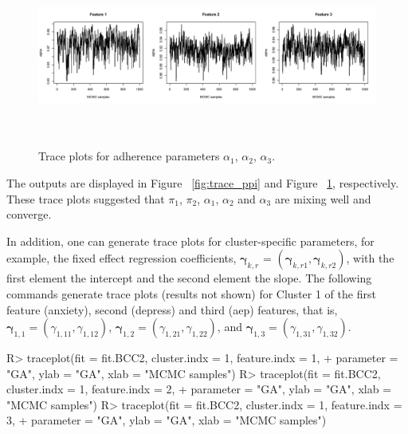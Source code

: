 \begin{figure}[h]
\centering
\includegraphics[width=\textwidth,height=6cm]{./Figures/trace_alpha.JPEG}
\caption{\label{fig:trace_alpha}  Trace plots for adherence parameters $\alpha_1$, $\alpha_2$, $\alpha_3$.}
\end{figure}

The outputs are displayed in Figure ~\ref{fig:trace_ppi} and Figure ~\ref{fig:trace_alpha}, respectively. These trace plots suggested that $\pi_1$, $\pi_2$, $\alpha_1$, $\alpha_2$ and $\alpha_3$ are mixing well and converge. 

In addition, one can generate trace plots for cluster-specific parameters, for example, the fixed effect regression coefficients, $\boldsymbol{\gamma}_{k, r}$ = $(\boldsymbol{\gamma}_{k, r1}, \boldsymbol{\gamma}_{k, r2})$, with the first element the intercept and the second element the slope.  The following commands generate trace plots (results not shown) for Cluster 1 of the first feature (anxiety), second (depress) and third (aep) features, that is,  $\boldsymbol{\gamma}_{1,1} = (\gamma_{1,11}, \gamma_{1,12})$,  $\boldsymbol{\gamma}_{1,2} = (\gamma_{1,21}, \gamma_{1,22})$, and $\boldsymbol{\gamma}_{1,3} = (\gamma_{1,31}, \gamma_{1,32})$. 

\begin{example}
R> traceplot(fit = fit.BCC2, cluster.indx = 1, feature.indx = 1,
+        parameter = "GA", ylab = "GA", xlab = "MCMC samples")
R> traceplot(fit = fit.BCC2, cluster.indx = 1, feature.indx = 2,
+        parameter = "GA", ylab = "GA", xlab = "MCMC samples")
R> traceplot(fit = fit.BCC2, cluster.indx = 1, feature.indx = 3,
+        parameter = "GA", ylab = "GA", xlab = "MCMC samples")
\end{example} 


